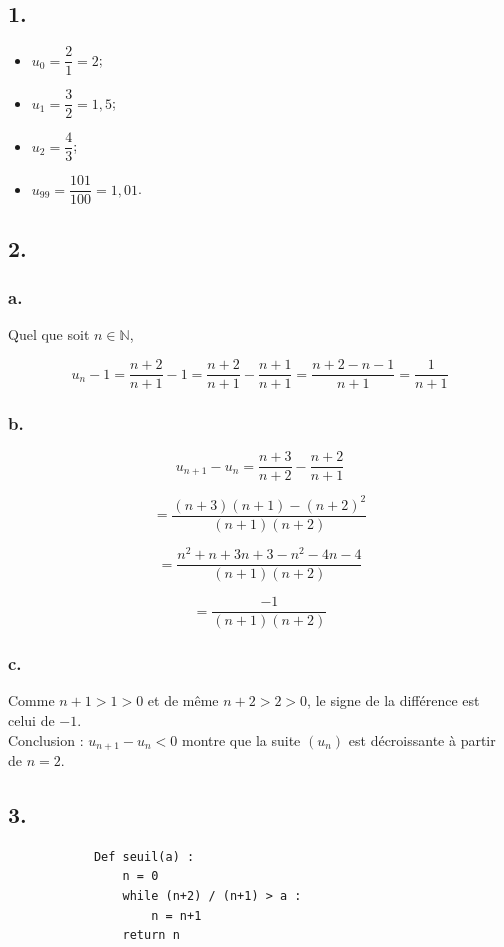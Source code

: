 \subsection*{1.}
	
	
	\begin{itemize}
		\item \(u_0 = \dfrac{2}{1} = 2\);
		\item \(u_1 = \dfrac{3}{2} = 1,5\);
		\item \(u_2 = \dfrac{4}{3}\);
		\item \(u_{99} = \dfrac{101}{100} = 1,01\).
	\end{itemize}
	
	\subsection*{2.}
	
	\subsubsection*{a.}
	

	Quel que soit \(n \in \mathbb{N}\),
	
	\[ u_n - 1 = \dfrac{n+2}{n+1} - 1 = \dfrac{n+2}{n+1} - \dfrac{n+1}{n+1} = \dfrac{n+2 - n - 1}{n+1} = \dfrac{1}{n+1} \]
	
	\subsubsection*{b.}
	

	
	\[ u_{n+1} - u_n = \dfrac{n+3}{n+2} - \dfrac{n+2}{n+1} \]
	
	\[ = \dfrac{(n+3)(n+1) - (n+2)^2}{(n+1)(n+2)} \]
	
	\[ = \dfrac{n^2 + n + 3n + 3 - n^2 - 4n - 4}{(n+1)(n+2)} \]
	
	\[ = \dfrac{-1}{(n+1)(n+2)} \]
	
	\subsubsection*{c.}
	

	Comme \(n+1 > 1 > 0\) et de même \(n+2 > 2 > 0\), le signe de la différence est celui de \(-1\).\\
	Conclusion : \(u_{n+1} - u_n < 0\) montre que la suite \((u_n)\) est décroissante à partir de \(n = 2\).
	
	\subsection*{3.}
\begin{center}
		\begin{minipage}{7cm}
		\begin{verbatim}
			Def seuil(a) :
				n = 0
				while (n+2) / (n+1) > a : 
					n = n+1
				return n 
		\end{verbatim}
	\end{minipage}
\end{center}
